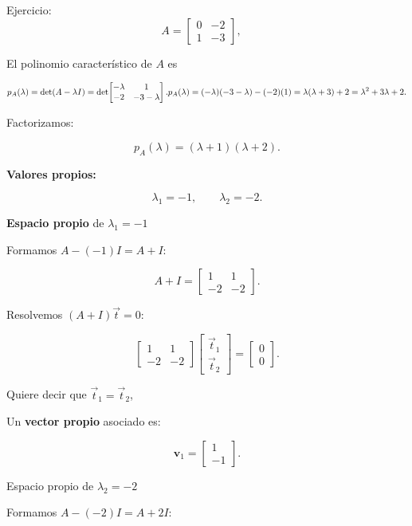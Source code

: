 \documentclass[
  letterpaper,
  DIV=11,
  numbers=noendperiod]{scrreprt}
\begin{document}
Ejercicio: \[
A=\begin{bmatrix}0 & -2\\[2pt] 1 & -3\end{bmatrix},\quad
\]

El polinomio característico de \(A\) es

\[
p_A(\lambda) = \det(A - \lambda I) = 
\det\!\begin{bmatrix}
-\lambda & 1\\
-2 & -3 - \lambda
\end{bmatrix}.\\
\\p_A(\lambda) = (-\lambda)(- 3 -\lambda) - (-2)(1)
= \lambda(\lambda + 3) + 2
= \lambda^2 + 3\lambda + 2.
\]

Factorizamos:

\[
p_A(\lambda) = (\lambda + 1)(\lambda + 2).
\]

\textbf{Valores propios: }

\[
\lambda_1 = -1, \qquad \lambda_2 = -2.
\]

\textbf{Espacio propio} de \(\lambda_1 = -1\)

Formamos \(A - (-1)I = A + I\):

\[
A + I = 
\begin{bmatrix}
1 & 1\\
-2 & -2
\end{bmatrix}.
\]

Resolvemos \((A + I)\)\(\vec{t} = 0\):

\[
\begin{bmatrix}1 & 1\\-2 & -2\end{bmatrix}
\begin{bmatrix}\vec{t}_1\\\vec{t}_2\end{bmatrix}
=\begin{bmatrix}0\\0\end{bmatrix}.
\]

Quiere decir que \(\vec{t}_1 = \vec{t}_2\),

Un \textbf{vector propio} asociado es:

\[
\mathbf{v}_1 =
\begin{bmatrix}
1\\
-1
\end{bmatrix}.
\]

Espacio propio de \(\lambda_2 = -2\)

Formamos \(A - (-2)I = A + 2I\):
\end{document}
